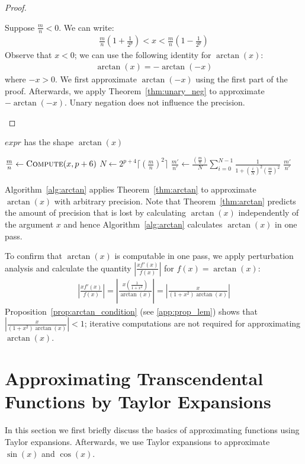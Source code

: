 \documentclass{article}
\newcommand{\expr}{\textit{expr}}
\numberwithin{mytheorem}{section}
\newcommand{\arctansumu}[2] {\frac{#1}{#2} \sum_{i=0}^{#2-1}\frac{1}{1+(\frac{i}{#2})^2{#1}^2}}
\begin{document}
\begin{proof}
\begin{enumerate}
Suppose $\frac{m}{n}<0$. We can write:
\begin{align*}
\frac{m}{n}(1+\frac{1}{2^p})<x<\frac{m}{n}(1-\frac{1}{2^p})
\end{align*}
Observe that $x<0$; we can use the following identity for $\arctan(x)$:
\begin{align*}
\arctan(x)=-\arctan(-x)
\end{align*}
where $-x>0$. We first approximate $\arctan(-x)$ using the first part of the proof. Afterwards, we apply Theorem~\ref{thm:unary_neg} to approximate $-\arctan(-x)$. Unary negation does not influence the precision. 
\end{enumerate}
\end{proof}

\begin{algorithm}
\caption{Arctangent}\label{alg:arctan}
\begin{algorithmic}[1]
\Require $\expr$ has the shape $\arctan(x)$
\Procedure{Compute}{$\expr,p$}

\State $\frac{m}{n} \gets \Call{Compute}{x,p+6}$
\State $N\gets 2^{p+4}\lceil(\frac{m}{n})^2\rceil$
\State $\frac{m'}{n'}\gets \arctansumu{(\frac{m}{n})}{N}$
\State \Return $\frac{m'}{n'}$
\EndProcedure
\end{algorithmic}
\end{algorithm}



Algorithm~\ref{alg:arctan} applies Theorem~\ref{thm:arctan} to approximate $\arctan(x)$ with arbitrary precision. Note that  Theorem~\ref{thm:arctan} predicts the amount of precision that is lost by calculating $\arctan(x)$ independently of the argument $x$ and hence Algorithm~\ref{alg:arctan} calculates $\arctan(x)$ in one pass. 

To confirm that $\arctan(x)$ is computable in one pass, we apply perturbation analysis and calculate the quantity $|\frac{xf'(x)}{f(x)}|$ for $f(x)=\arctan(x)$:
\begin{align*}
|\frac{xf'(x)}{f(x)}|=|\frac{x(\frac{1}{1+x^2})}{\arctan(x)}|=|\frac{x}{(1+x^2)\arctan(x)}|
\end{align*}
Proposition~\ref{prop:arctan_condition} (see \ref{app:prop_lem}) shows that $|\frac{x}{(1+x^2)\arctan(x)}|<1$; iterative computations are not required for approximating $\arctan(x)$. 

\section{Approximating Transcendental Functions by Taylor Expansions}\label{sec:taylor}
In this section we first briefly discuss the basics of approximating functions using Taylor expansions. Afterwards, we use Taylor expansions to approximate $\sin(x)$ and $\cos(x)$.
 
\end{document}
